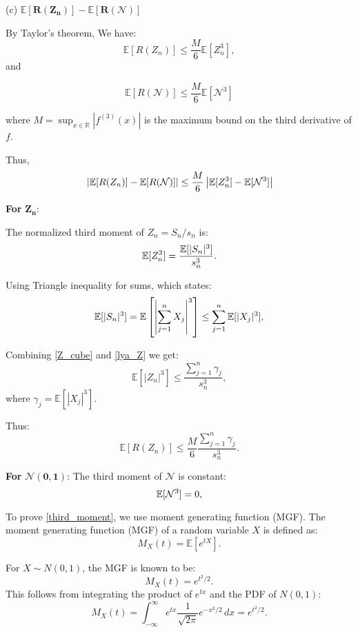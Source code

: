 (c) $\boldsymbol{\mathbb{E}[R(Z_n)] - \mathbb{E}[R(\mathcal{N})]}$

By Taylor's theorem, We have:
\[
\mathbb{E}[R(Z_n)] \leq \frac{M}{6} \mathbb{E}[Z_n^3], 
\]
and

\[
\mathbb{E}[R(\mathcal{N})] \leq \frac{M}{6} \mathbb{E}[\mathcal{N}^3]
\]

where \( M = \sup_{x \in \mathbb{R}} |f^{(3)}(x)| \) is the maximum bound on the third derivative of \( f \).

Thus, 
\begin{equation}{\label{final_eq}}
    \left| \mathbb{E}[R(Z_n)] - \mathbb{E}[R(\mathcal{N})] \right| \leq \frac{M}{6} \left|\mathbb{E}[Z_n^3] - \mathbb{E}[\mathcal{N}^3] \right| 
\end{equation}


\textbf{For} $\boldsymbol{Z_n}$:

The normalized third moment of \( Z_n = S_n / s_n \) is:
\begin{equation}{\label{Z_cube}}
    \mathbb{E}[Z_n^3] = \frac{\mathbb{E}[|S_n|^3]}{s_n^3}.
\end{equation}

Using Triangle inequality for sums, which states:
\begin{equation}{\label{lya_Z}}
    \mathbb{E}[|S_n|^3] = \mathbb{E}\left[\left| \sum_{j=1}^n X_j \right|^3\right] \leq \sum_{j=1}^n \mathbb{E}[|X_j|^3],
\end{equation}

Combining \eqref{Z_cube} and \eqref{lya_Z} we get:
\[
\mathbb{E}[|Z_n|^3] \leq \frac{\sum_{j=1}^n \gamma_j}{s_n^3},
\]
where \( \gamma_j = \mathbb{E}[|X_j|^3] \).

Thus:
\[
\mathbb{E}[R(Z_n)] \leq \frac{M}{6} \frac{\sum_{j=1}^n \gamma_j}{s_n^3}.
\]



\textbf{For} $\boldsymbol{\mathcal{N}(0,1)}$:
The third moment of \( \mathcal{N} \) is constant:
\begin{equation}{\label{third_moment}}
    \mathbb{E}[\mathcal{N}^3] = 0,
\end{equation}

To prove \eqref{third_moment}, we use moment generating function (MGF). The moment generating function (MGF) of a random variable \( X \) is defined as:
\[
M_X(t) = \mathbb{E}[e^{tX}].
\]

For \( X \sim N(0, 1) \), the MGF is known to be:
\[
M_X(t) = e^{t^2 / 2}.
\]
This follows from integrating the product of \( e^{tx} \) and the PDF of \( N(0, 1) \):
\[
M_X(t) = \int_{-\infty}^\infty e^{tx} \frac{1}{\sqrt{2\pi}} e^{-x^2 / 2} \, dx = e^{t^2 / 2}.
\]

